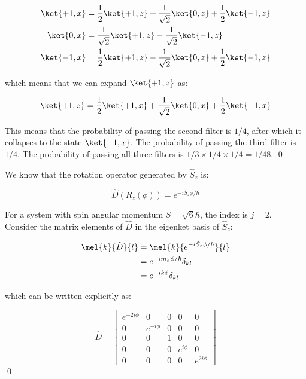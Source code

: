 \documentclass[12pt]{article}
\begin{document}
\begin{equation}
\begin{split}
    \ket{+1, x} &= \frac{1}{2} \ket{+1, z} + \frac{1}{\sqrt{2}} \ket{0, z} + \frac{1}{2} \ket{-1, z} \\
    \ket{0, x} &= \frac{1}{\sqrt{2}} \ket{+1, z} - \frac{1}{\sqrt{2}} \ket{-1, z} \\
    \ket{-1, x} &= \frac{1}{2} \ket{+1, z} - \frac{1}{\sqrt{2}} \ket{0, z} + \frac{1}{2} \ket{-1, z}
\end{split}
\end{equation}

which means that we can expand $\ket{+1, z}$ as:

\begin{equation}
    \ket{+1, z} = \frac{1}{2} \ket{+1, x} + \frac{1}{\sqrt{2}} \ket{0, x} + \frac{1}{2} \ket{-1, x}
\end{equation}

This means that the probability of passing the second filter is $1/4$, after which it collapses to the state $\ket{+1, x}$. The probability of passing the third filter is $1/4$. The probability of passing all three filters is $1/3 \times 1/4 \times 1/4 = 1/48$.
\qed


We know that the rotation operator generated by $\hat{S}_{z}$ is:

\begin{equation}
    \hat{D}(R_{z}(\phi)) = e^{-i\hat{S}_{z}\phi/\hbar}
\end{equation}

For a system with spin angular momentum $S = \sqrt{6}\hbar$, the index is $j = 2$. Consider the matrix elements of $\hat{D}$ in the eigenket basis of $\hat{S}_{z}$:

\begin{equation}
\begin{split}
    \mel{k}{\hat{D}}{l} &= \mel{k}{e^{-i\hat{S}_{z}\phi/\hbar}}{l} \\
    &= e^{-im_{k}\phi/\hbar} \delta_{kl} \\
    &= e^{-ik\phi} \delta_{kl}
\end{split}
\end{equation}

which can be written explicitly as:

\begin{equation}
    \hat{D} =
    \begin{bmatrix}
        e^{-2i\phi} & 0 & 0 & 0 & 0 \\
        0 & e^{-i\phi} & 0 & 0 & 0 \\
        0 & 0 & 1 & 0 & 0 \\
        0 & 0 & 0 & e^{i\phi} & 0 \\
        0 & 0 & 0 & 0 & e^{2i\phi}
    \end{bmatrix}
\end{equation}
\qed
\end{document}
